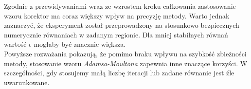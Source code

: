 \documentclass[a4paper,12pt]{article}
\begin{document}
Zgodnie z przewidywaniami wraz ze wzrostem kroku całkowania zastosowanie wzoru korektor ma coraz większy wpływ na precyzję metody. Warto jednak zaznaczyć, że eksperyment został przeprowadzony na stosunkowo bezpiecznych numerycznie równaniach w zadanym regionie. Dla mniej stabilnych równań wartość $\epsilon$ mogłaby być znacznie większa.\\ 
Powyższe rozważania pokazują, że pomimo braku wpływu na szybkość zbieżności metody, stosowanie wzoru \textit{Adamsa-Moultona} zapewnia inne znaczące korzyści. W szczególności, gdy stosujemy małą liczbę iteracji lub zadane równanie jest źle uwarunkowane.
\end{document}

